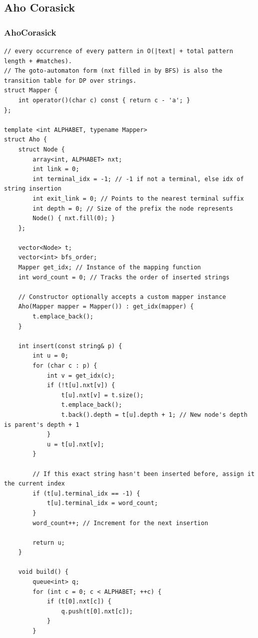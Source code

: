 \documentclass[9pt,a4paper,twocolumn]{extarticle}
\begin{document}
\subsection{Aho Corasick}

\filbreak
\subsubsection{AhoCorasick}
\nopagebreak
\begin{lstlisting}
// every occurrence of every pattern in O(|text| + total pattern length + #matches).
// The goto-automaton form (nxt filled in by BFS) is also the transition table for DP over strings.
struct Mapper {
    int operator()(char c) const { return c - 'a'; }
};

template <int ALPHABET, typename Mapper>
struct Aho {
    struct Node {
        array<int, ALPHABET> nxt;
        int link = 0;
        int terminal_idx = -1; // -1 if not a terminal, else idx of string insertion
        int exit_link = 0; // Points to the nearest terminal suffix
        int depth = 0; // Size of the prefix the node represents
        Node() { nxt.fill(0); }
    };

    vector<Node> t;
    vector<int> bfs_order;
    Mapper get_idx; // Instance of the mapping function
    int word_count = 0; // Tracks the order of inserted strings

    // Constructor optionally accepts a custom mapper instance
    Aho(Mapper mapper = Mapper()) : get_idx(mapper) {
        t.emplace_back();
    }

    int insert(const string& p) {
        int u = 0;
        for (char c : p) {
            int v = get_idx(c);
            if (!t[u].nxt[v]) {
                t[u].nxt[v] = t.size();
                t.emplace_back();
                t.back().depth = t[u].depth + 1; // New node's depth is parent's depth + 1
            }
            u = t[u].nxt[v];
        }

        // If this exact string hasn't been inserted before, assign it the current index
        if (t[u].terminal_idx == -1) {
            t[u].terminal_idx = word_count;
        }
        word_count++; // Increment for the next insertion

        return u;
    }

    void build() {
        queue<int> q;
        for (int c = 0; c < ALPHABET; ++c) {
            if (t[0].nxt[c]) {
                q.push(t[0].nxt[c]);
            }
        }


\end{lstlisting}
\end{document}
